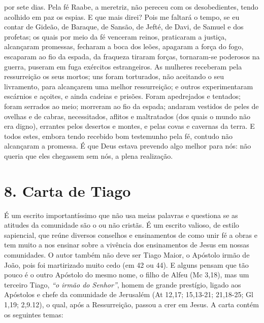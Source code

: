 \documentclass[
]{book}
\begin{document}
por sete dias. Pela fé Raabe, a meretriz, não pereceu com os desobedientes, tendo acolhido em paz os espias. E que mais direi? Pois me faltará o tempo, se eu contar de Gideão, de Baraque, de Sansão, de Jefté, de Davi, de Samuel e dos profetas; os quais por meio da fé venceram reinos, praticaram a justiça, alcançaram promessas, fecharam a boca dos leões, apagaram a força do fogo, escaparam ao fio da espada, da fraqueza tiraram forças, tornaram-se poderosos na guerra, puseram em fuga exércitos estrangeiros. As mulheres receberam pela ressurreição os seus mortos; uns foram torturados, não aceitando o seu livramento, para alcançarem uma melhor ressurreição; e outros experimentaram escárnios e açoites, e ainda cadeias e prisões. Foram apedrejados e tentados; foram serrados ao meio; morreram ao fio da espada; andaram vestidos de peles de ovelhas e de cabras, necessitados, aflitos e maltratados (dos quais o mundo não era digno), errantes pelos desertos e montes, e pelas covas e cavernas da terra. E todos estes, embora tendo recebido bom testemunho pela fé, contudo não alcançaram a promessa. É que Deus estava prevendo algo melhor para nós: não queria que eles chegassem sem nós, a plena realização.

\hypertarget{carta-de-tiago}{%
\section*{8. Carta de Tiago}\label{carta-de-tiago}}

É um escrito importantíssimo que não usa meias palavras e questiona se as atitudes da comunidade são o ou não cristãs. É um escrito valioso, de estilo sapiencial, que reúne diversos conselhos e ensinamentos de como unir fé a obras e tem muito a nos ensinar sobre a vivência dos ensinamentos de Jesus em nossas comunidades. O autor também não deve ser Tiago Maior, o Apóstolo irmão de João, pois foi martirizado muito cedo (em 42 ou 44). E alguns pensam que tão pouco é o outro Apóstolo do mesmo nome, o filho de Alfeu (Mc 3,18), mas um terceiro Tiago, \emph{``o irmão do Senhor''}, homem de grande prestígio, ligado aos Apóstolos e chefe da comunidade de Jerusalém (At 12,17; 15,13-21; 21,18-25; Gl 1,19; 2,9.12), o qual, após a Ressurreição, passou a crer em Jesus. A carta contém os seguintes temas:
\end{document}
